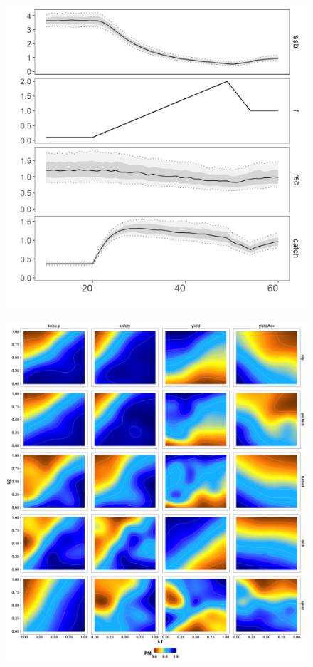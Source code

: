 \documentclass[preprint,12pt]{elsarticle}
\begin{document}
\begin{figure}[]\centering\includegraphics[width=5in]{fig4.png}\caption{}\label{fig:fig4}\end{figure}
\begin{figure}[]\centering\includegraphics[width=5in]{fig5.png}\caption{}\label{fig:fig5}\end{figure}
\end{document}
